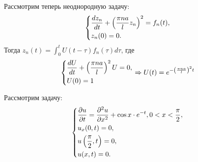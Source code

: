 \documentclass[11pt]{article}
\begin{document}
Рассмотрим теперь неоднородную задачу:
\begin{equation}
\begin{dcases}
\frac{dz_n}{dt} + \left(\frac{\pi na}lz_n\right)^2 = f_n(t), \\
z_n(0) = 0.
\end{dcases}
\end{equation}
Тогда $z_n(t) = \int_0^tU(t - \tau)f_n(\tau)d\tau$, где
\begin{equation}
\begin{dcases}
\frac{dU}{dt} + \left(\frac{\pi n a}l\right)^2U = 0, \\
U(0) = 1
\end{dcases}
\Rightarrow U(t) = e^{-\left(\frac{\pi n a}l\right)^2t}
\end{equation}

Рассмотрим задачу:
\begin{equation}
\begin{dcases}
\frac{\partial u}{\partial t} = \frac{\partial^2 u}{\partial x^2} + \cos x\cdot e^{-t}, 0 < x < \frac{\pi}2, \\
u_x(0, t) = 0, \\
u\left(\frac{\pi}2, t\right) = 0, \\
u(x, t) = 0.
\end{dcases}
\end{equation}
\end{document}
